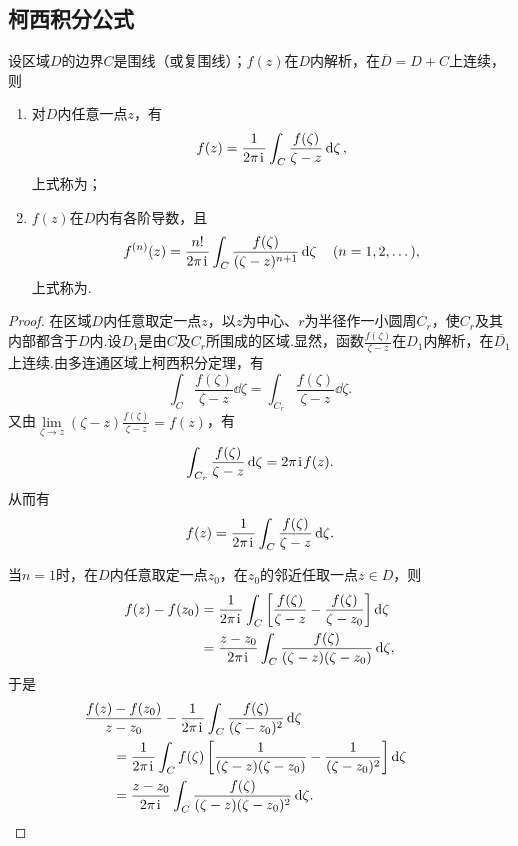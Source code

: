 \subsection{柯西积分公式}
\begin{theorem}\label{theorem:解析函数的积分表示.柯西积分公式}
设区域\(D\)的边界\(C\)是围线（或复围线）；\(f(z)\)在\(D\)内解析，在\(\overline{D}=D+C\)上连续，则\begin{enumerate}
\item 对\(D\)内任意一点\(z\)，有\begin{equation}\label{equation:解析函数的积分表示.柯西积分公式}
f(z) = \frac{1}{2\pi\kern1pt\mathrm{i}\kern1pt} \int_C \frac{f(\zeta)}{\zeta-z} \dd{\zeta},
\end{equation}上式称为；
\item \(f(z)\)在\(D\)内有各阶导数，且\begin{equation}\label{equation:解析函数的积分表示.柯西高阶导数公式}
f^{(n)}(z) = \frac{n!}{2\pi\kern1pt\mathrm{i}\kern1pt} \int_C \frac{f(\zeta)}{(\zeta-z)^{n+1}} \dd{\zeta} \quad (n=1,2,\dots),
\end{equation}上式称为.
\end{enumerate}
\begin{proof}
在区域\(D\)内任意取定一点\(z\)，以\(z\)为中心、\(r\)为半径作一小圆周\(C_r\)，使\(C_r\)及其内部都含于\(D\)内.设\(D_1\)是由\(C\)及\(C_r\)所围成的区域.显然，函数\(\frac{f(\zeta)}{\zeta-z}\)在\(D_1\)内解析，在\(\overline{D_1}\)上连续.由多连通区域上柯西积分定理，有\[
\int_C{\frac{f(\zeta)}{\zeta-z}\dd{\zeta}}
= \int_{C_r}{\frac{f(\zeta)}{\zeta-z}\dd{\zeta}}.
\]又由\(\lim\limits_{\zeta \to z} (\zeta-z) \frac{f(\zeta)}{\zeta-z} = f(z)\)，有\[
\int_{C_r}{\frac{f(\zeta)}{\zeta-z}\dd{\zeta}} = 2\pi\kern1pt\mathrm{i}\kern1pt f(z).
\]从而有\[
f(z) = \frac{1}{2\pi\kern1pt\mathrm{i}\kern1pt} \int_C{\frac{f(\zeta)}{\zeta-z}\dd{\zeta}}.
\]

当\(n=1\)时，在\(D\)内任意取定一点\(z_0\)，在\(z_0\)的邻近任取一点\(z \in D\)，则\begin{align*}
f(z)-f(z_0)
&= \frac{1}{2\pi\kern1pt\mathrm{i}\kern1pt} \int_C{\left[\frac{f(\zeta)}{\zeta-z}-\frac{f(\zeta)}{\zeta-z_0}\right]\dd{\zeta}} \\
&= \frac{z-z_0}{2\pi\kern1pt\mathrm{i}\kern1pt} \int_C{\frac{f(\zeta)}{(\zeta-z)(\zeta-z_0)}\dd{\zeta}},
\end{align*}
于是\begin{align*}
&\hspace{-20pt}\frac{f(z)-f(z_0)}{z-z_0} - \frac{1}{2\pi\iu} \int_C{\frac{f(\zeta)}{(\zeta-z_0)^2} \dd{\zeta}} \\
&=\frac{1}{2\pi\iu} \int_C{f(\zeta) \left[\frac{1}{(\zeta-z)(\zeta-z_0)}-\frac{1}{(\zeta-z_0)^2}\right]\dd{\zeta}} \\
&=\frac{z-z_0}{2\pi\iu} \int_C{\frac{f(\zeta)}{(\zeta-z)(\zeta-z_0)^2}\dd{\zeta}}.
\end{align*}


\end{proof}
\end{theorem}
